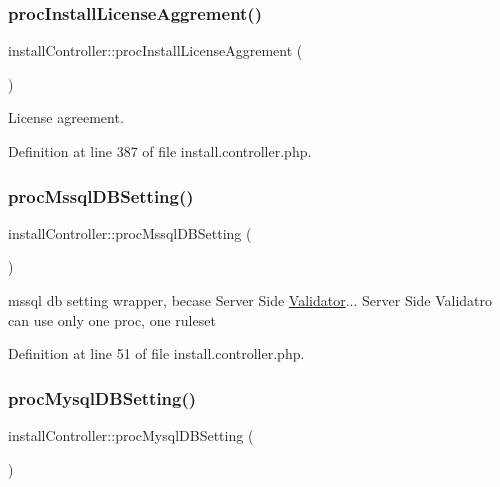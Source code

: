\subsubsection{\texorpdfstring{proc\+Install\+License\+Aggrement()}{procInstallLicenseAggrement()}}
{\footnotesize\ttfamily install\+Controller\+::proc\+Install\+License\+Aggrement (\begin{DoxyParamCaption}{ }\end{DoxyParamCaption})}



License agreement. 



Definition at line 387 of file install.\+controller.\+php.

\mbox{\label{classinstallController_a583b9b74e93bf6a762a7bd6d08e2b23a}} 
\subsubsection{\texorpdfstring{proc\+Mssql\+D\+B\+Setting()}{procMssqlDBSetting()}}
{\footnotesize\ttfamily install\+Controller\+::proc\+Mssql\+D\+B\+Setting (\begin{DoxyParamCaption}{ }\end{DoxyParamCaption})}



mssql db setting wrapper, becase Server Side \hyperlink{classValidator}{Validator}... Server Side Validatro can use only one proc, one ruleset 



Definition at line 51 of file install.\+controller.\+php.

\mbox{\label{classinstallController_a9d46a8423a90109be5dc1edf8238630e}} 
\subsubsection{\texorpdfstring{proc\+Mysql\+D\+B\+Setting()}{procMysqlDBSetting()}}
{\footnotesize\ttfamily install\+Controller\+::proc\+Mysql\+D\+B\+Setting (\begin{DoxyParamCaption}{ }\end{DoxyParamCaption})}



